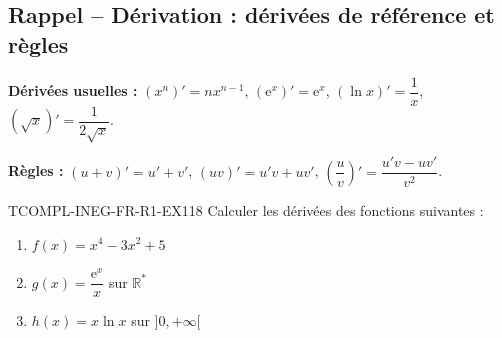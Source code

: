 

\subsection*{Rappel -- Dérivation : dérivées de référence et règles}

\textbf{Dérivées usuelles :} $(x^n)' = n x^{n-1}$, $(\mathrm{e}^x)' = \mathrm{e}^x$, $(\ln x)' = \dfrac{1}{x}$, $(\sqrt{x})' = \dfrac{1}{2\sqrt{x}}$.

\textbf{Règles :} $(u+v)' = u' + v'$, $(uv)' = u'v + uv'$, $\left(\dfrac{u}{v}\right)' = \dfrac{u'v - uv'}{v^2}$.

\begin{exercice}{TCOMPL-INEG-FR-R1-EX1}{1}{8}
Calculer les dérivées des fonctions suivantes :
\begin{enumerate}
  \item $f(x) = x^4 - 3x^2 + 5$
  \item $g(x) = \dfrac{\mathrm{e}^x}{x}$ sur $\mathbb{R}^*$
  \item $h(x) = x \ln x$ sur $]0, +\infty[$
\end{enumerate}
\end{exercice}

